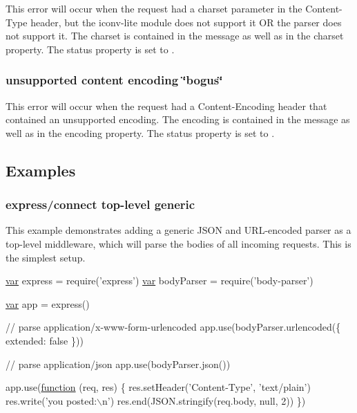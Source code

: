 This error will occur when the request had a charset parameter in the {\ttfamily Content-\/\+Type} header, but the {\ttfamily iconv-\/lite} module does not support it O\+R the parser does not support it. The charset is contained in the message as well as in the {\ttfamily charset} property. The {\ttfamily status} property is set to {}.

\subsubsection*{unsupported content encoding \char`\"{}bogus\char`\"{}}

This error will occur when the request had a {\ttfamily Content-\/\+Encoding} header that contained an unsupported encoding. The encoding is contained in the message as well as in the {\ttfamily encoding} property. The {\ttfamily status} property is set to {}.

\subsection*{Examples}

\subsubsection*{express/connect top-\/level generic}

This example demonstrates adding a generic J\+S\+O\+N and U\+R\+L-\/encoded parser as a top-\/level middleware, which will parse the bodies of all incoming requests. This is the simplest setup.


\begin{DoxyCode}
\hyperlink{018__def_8c_a335628f2e9085305224b4f9cc6e95ed5}{var} express = require(\textcolor{stringliteral}{'express'})
\hyperlink{018__def_8c_a335628f2e9085305224b4f9cc6e95ed5}{var} bodyParser = require('body-parser')

\hyperlink{018__def_8c_a335628f2e9085305224b4f9cc6e95ed5}{var} app = express()

\textcolor{comment}{// parse application/x-www-form-urlencoded}
app.use(bodyParser.urlencoded(\{ extended: \textcolor{keyword}{false} \}))

\textcolor{comment}{// parse application/json}
app.use(bodyParser.json())

app.use(\hyperlink{class_test_a51a683fa4fcec142ab1574e00a7b6860}{function} (req, res) \{
  res.setHeader(\textcolor{stringliteral}{'Content-Type'}, \textcolor{stringliteral}{'text/plain'})
  res.write(\textcolor{stringliteral}{'you posted:\(\backslash\)n'})
  res.end(JSON.stringify(req.body, null, 2))
\})
\end{DoxyCode}


